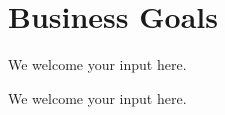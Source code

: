 \section{Business Goals}\label{sec:ekgmm-a-1-2}

We welcome your input here.

\ekgmmContextSection

We welcome your input here.
